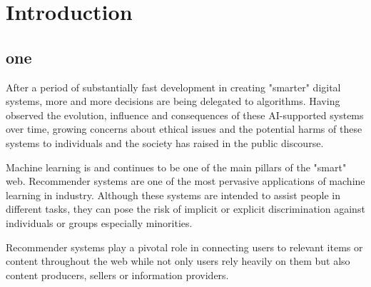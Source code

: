 \chapter{Introduction}
\label{introchap}


\section{one}

\begin{comment}
example 
problems that exist
approaches
\end{comment}


After a period of substantially fast development in creating "smarter" digital systems, more and more decisions are being delegated to algorithms. Having observed the evolution, influence and consequences of these AI-supported systems over time, growing concerns about ethical issues and the potential harms of these systems to individuals and the society has raised in the public discourse.

Machine learning is and continues to be one of the main pillars of the "smart" web. Recommender systems are one of the most pervasive applications of machine learning in industry. Although these systems are intended to assist people in different tasks, they can pose the risk of implicit or explicit discrimination against individuals or groups especially minorities.


Recommender systems play a pivotal role in connecting users to relevant items or content throughout the web while not only users rely heavily on them but also content producers, sellers or information providers. 


\begin{comment}
Consider a recommender system suggesting job opportunities to job seekers. Many online platforms attempt to connect job employments and job applicants in some way. Sometimes they are professional networks which have a job-seeking component such as Xing and LinkedIn, or they might have been designed only for employment seeking.

Discriminatory recommendations in this system could mean that men and women with similar qualifications don't get recommendations of jobs with similar rank and salary. Or when they get similar recommendations, it is just because of their demographic information not because of their qualifications. For examples, if there are more women on a job recommendation website and they all apply for secretarial jobs, these jobs might show up in the recommendations of women who are looking for CEO jobs. On the other side of the coin, jobs with better salaries and higher ranks will be recommended to men regardless of their qualifications. The system would therefore need to defend against biases in recommendation output, even biases that arise due to behavioral differences: for example, male users might be more likely to click optimistically on high-paying jobs. \todo{more clarifications?}

\end{comment}


